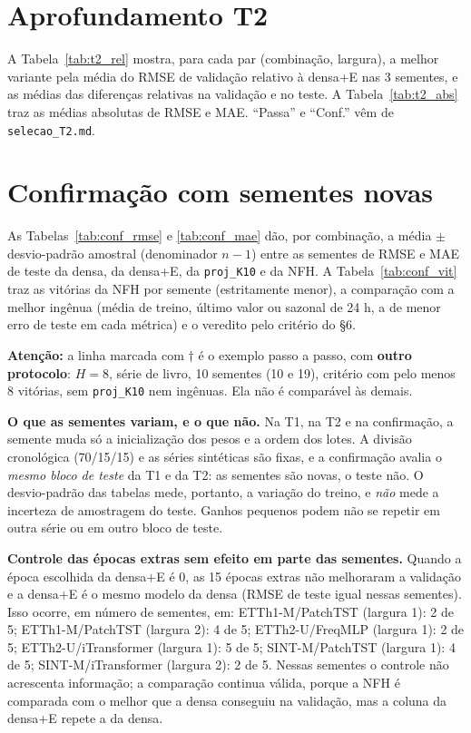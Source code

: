 \documentclass[11pt,a4paper]{article}
\begin{document}




\section{Aprofundamento T2}
A Tabela~\ref{tab:t2_rel} mostra, para cada par (combinação, largura), a melhor variante pela média do RMSE de validação relativo à densa+E nas 3 sementes, e as médias das diferenças relativas na validação e no teste. A Tabela~\ref{tab:t2_abs} traz as médias absolutas de RMSE e MAE. ``Passa'' e ``Conf.'' vêm de \texttt{selecao\_T2.md}.





\section{Confirmação com sementes novas}
As Tabelas~\ref{tab:conf_rmse} e \ref{tab:conf_mae} dão, por combinação, a média $\pm$ desvio-padrão amostral (denominador $n-1$) entre as sementes de RMSE e MAE de teste da densa, da densa+E, da \texttt{proj\_K10} e da NFH. A Tabela~\ref{tab:conf_vit} traz as vitórias da NFH por semente (estritamente menor), a comparação com a melhor ingênua (média de treino, último valor ou sazonal de 24 h, a de menor erro de teste em cada métrica) e o veredito pelo critério do \S{}6.

\textbf{Atenção:} a linha marcada com $\dagger$ é o exemplo passo a passo, com \textbf{outro protocolo}: $H=8$, série de livro, 10 sementes (10 e 19), critério com pelo menos 8 vitórias, sem \texttt{proj\_K10} nem ingênuas. Ela não é comparável às demais.

\textbf{O que as sementes variam, e o que não.} Na T1, na T2 e na confirmação, a semente muda só a inicialização dos pesos e a ordem dos lotes. A divisão cronológica (70/15/15) e as séries sintéticas são fixas, e a confirmação avalia o \emph{mesmo bloco de teste} da T1 e da T2: as sementes são novas, o teste não. O desvio-padrão das tabelas mede, portanto, a variação do treino, e \emph{não} mede a incerteza de amostragem do teste. Ganhos pequenos podem não se repetir em outra série ou em outro bloco de teste.







\textbf{Controle das épocas extras sem efeito em parte das sementes.} Quando a época escolhida da densa+E é 0, as 15 épocas extras não melhoraram a validação e a densa+E é o mesmo modelo da densa (RMSE de teste igual nessas sementes). Isso ocorre, em número de sementes, em: ETTh1-M/PatchTST (largura 1): 2 de 5; ETTh1-M/PatchTST (largura 2): 4 de 5; ETTh2-U/FreqMLP (largura 1): 2 de 5; ETTh2-U/iTransformer (largura 1): 5 de 5; SINT-M/PatchTST (largura 1): 4 de 5; SINT-M/iTransformer (largura 2): 2 de 5. Nessas sementes o controle não acrescenta informação; a comparação continua válida, porque a NFH é comparada com o melhor que a densa conseguiu na validação, mas a coluna da densa+E repete a da densa.
\end{document}
